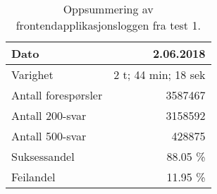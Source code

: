 \begin{table}[hbtp]
  \caption{Oppsummering av frontend\-applikasjons\-loggen fra test 1.}
  \begin{center}
    \begin{tabular}{ | l | r |}
      \hline
      Dato & 2.06.2018 \\ \hline
      Varighet & 2 t; 44 min; 18 sek \\ \hline
      Antall forespørsler & 3587467 \\ \hline
      Antall 200-svar & 3158592 \\ \hline
      Antall 500-svar & 428875 \\ \hline
      Suksessandel & 88.05 \% \\ \hline
      Feilandel & 11.95 \% \\ \hline
    \end{tabular}
  \end{center}
  \label{frontend1}
\end{table}
